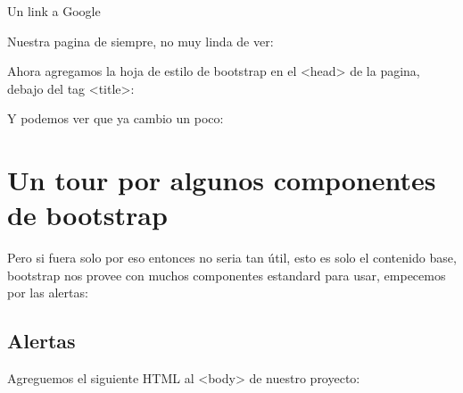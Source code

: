 \documentclass[letterpaper,10pt,spanish]{sphinxmanual}
\begin{document}
\begin{sphinxVerbatim}[commandchars=\\\{\}]
        Un link a  Google

\end{sphinxVerbatim}

Nuestra pagina de siempre, no muy linda de ver:

\begin{figure}[htbp]
\centering

\noindent{}
\end{figure}

Ahora agregamos la hoja de estilo de bootstrap en el \textless{}head\textgreater{} de la pagina,
debajo del tag \textless{}title\textgreater{}:

%
\begin{sphinxVerbatim}[commandchars=\\\{\}]
  
\end{sphinxVerbatim}

Y podemos ver que ya cambio un poco:

\begin{figure}[htbp]
\centering

\noindent{}
\end{figure}


\section{Un tour por algunos componentes de bootstrap}
\label{\detokenize{reusando-estilo-de-otros:un-tour-por-algunos-componentes-de-bootstrap}}
Pero si fuera solo por eso entonces no seria tan útil, esto es solo el
contenido base, bootstrap nos provee con muchos componentes estandard para
usar, empecemos por las alertas:


\subsection{Alertas}
\label{\detokenize{reusando-estilo-de-otros:alertas}}
Agreguemos el siguiente HTML al \textless{}body\textgreater{} de nuestro proyecto:
\end{document}

